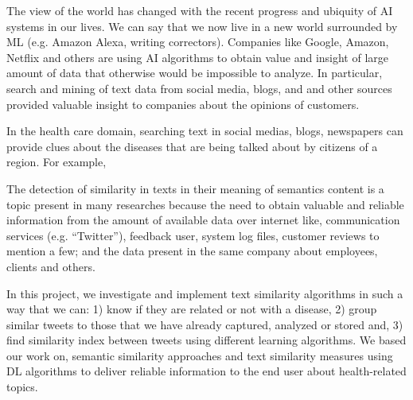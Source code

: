 \documentclass[12pt]{report}
\begin{document}
The view of the world has changed with the recent progress and ubiquity   of \ac{AI} systems in our lives. We can say that we now live in a new world surrounded by \ac{ML} (e.g. Amazon Alexa, writing correctors). Companies like Google, Amazon, Netflix and others are using \ac{AI} algorithms to obtain value and insight of large amount of data that  otherwise would be  impossible to analyze. In particular, search and mining of text data from social media, blogs, and and other sources provided valuable insight to companies about the opinions of customers. 

In the health care domain, searching text in social medias, blogs, newspapers can provide clues about the diseases that are being talked about 
by citizens of a region. For example, 

The detection of similarity in texts in their meaning of semantics content is a topic present in many researches because the need to obtain valuable and reliable information from the amount of available data over internet like, communication services (e.g. “Twitter”), feedback user, system log files, customer reviews to mention a few; and the data present in the same company about employees, clients and others. 

In this project, we investigate and implement text similarity algorithms in such a way that we can: 1) know if they are related or not with a disease, 2) group similar tweets to those that we have already captured, analyzed or stored and, 3) find similarity index between tweets using different learning algorithms. We based our work on, semantic similarity approaches and text similarity measures using \ac{DL} algorithms to deliver reliable information to the end user about health-related topics.
\end{document}
